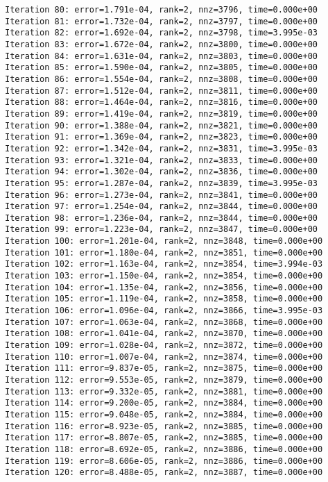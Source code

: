 \documentclass[11pt]{article}
\begin{document}
\begin{Verbatim}[commandchars=\\\{\}]
Iteration 80: error=1.791e-04, rank=2, nnz=3796, time=0.000e+00
Iteration 81: error=1.732e-04, rank=2, nnz=3797, time=0.000e+00
Iteration 82: error=1.692e-04, rank=2, nnz=3798, time=3.995e-03
Iteration 83: error=1.672e-04, rank=2, nnz=3800, time=0.000e+00
Iteration 84: error=1.631e-04, rank=2, nnz=3803, time=0.000e+00
Iteration 85: error=1.590e-04, rank=2, nnz=3805, time=0.000e+00
Iteration 86: error=1.554e-04, rank=2, nnz=3808, time=0.000e+00
Iteration 87: error=1.512e-04, rank=2, nnz=3811, time=0.000e+00
Iteration 88: error=1.464e-04, rank=2, nnz=3816, time=0.000e+00
Iteration 89: error=1.419e-04, rank=2, nnz=3819, time=0.000e+00
Iteration 90: error=1.388e-04, rank=2, nnz=3821, time=0.000e+00
Iteration 91: error=1.369e-04, rank=2, nnz=3823, time=0.000e+00
Iteration 92: error=1.342e-04, rank=2, nnz=3831, time=3.995e-03
Iteration 93: error=1.321e-04, rank=2, nnz=3833, time=0.000e+00
Iteration 94: error=1.302e-04, rank=2, nnz=3836, time=0.000e+00
Iteration 95: error=1.287e-04, rank=2, nnz=3839, time=3.995e-03
Iteration 96: error=1.273e-04, rank=2, nnz=3841, time=0.000e+00
Iteration 97: error=1.254e-04, rank=2, nnz=3844, time=0.000e+00
Iteration 98: error=1.236e-04, rank=2, nnz=3844, time=0.000e+00
Iteration 99: error=1.223e-04, rank=2, nnz=3847, time=0.000e+00
Iteration 100: error=1.201e-04, rank=2, nnz=3848, time=0.000e+00
Iteration 101: error=1.180e-04, rank=2, nnz=3851, time=0.000e+00
Iteration 102: error=1.163e-04, rank=2, nnz=3854, time=3.994e-03
Iteration 103: error=1.150e-04, rank=2, nnz=3854, time=0.000e+00
Iteration 104: error=1.135e-04, rank=2, nnz=3856, time=0.000e+00
Iteration 105: error=1.119e-04, rank=2, nnz=3858, time=0.000e+00
Iteration 106: error=1.096e-04, rank=2, nnz=3866, time=3.995e-03
Iteration 107: error=1.063e-04, rank=2, nnz=3868, time=0.000e+00
Iteration 108: error=1.041e-04, rank=2, nnz=3870, time=0.000e+00
Iteration 109: error=1.028e-04, rank=2, nnz=3872, time=0.000e+00
Iteration 110: error=1.007e-04, rank=2, nnz=3874, time=0.000e+00
Iteration 111: error=9.837e-05, rank=2, nnz=3875, time=0.000e+00
Iteration 112: error=9.553e-05, rank=2, nnz=3879, time=0.000e+00
Iteration 113: error=9.332e-05, rank=2, nnz=3881, time=0.000e+00
Iteration 114: error=9.200e-05, rank=2, nnz=3884, time=0.000e+00
Iteration 115: error=9.048e-05, rank=2, nnz=3884, time=0.000e+00
Iteration 116: error=8.923e-05, rank=2, nnz=3885, time=0.000e+00
Iteration 117: error=8.807e-05, rank=2, nnz=3885, time=0.000e+00
Iteration 118: error=8.692e-05, rank=2, nnz=3886, time=0.000e+00
Iteration 119: error=8.606e-05, rank=2, nnz=3886, time=0.000e+00
Iteration 120: error=8.488e-05, rank=2, nnz=3887, time=0.000e+00

\end{Verbatim}
\end{document}
